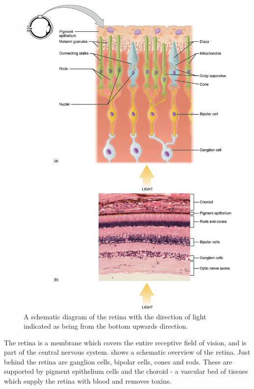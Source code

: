\begin{figure}[H]
\centering
  \includegraphics{figures/rods_and_cones}
\caption{A schematic diagram of the retina with the direction of light indicated
as being from the bottom upwards direction.\cite{yannuzzi2011retinal}}
\label{fig:retina}
\end{figure}

The retina is a membrane which covers the entire receptive field of
vision, and is part of the central nervous system.\cite{rogers1983neurite}
 shows a schematic overview of the retina. Just behind the
retina are ganglion cells, bipolar cells, cones and rods. These are supported
by pigment epithelium cells and the choroid - a vascular bed of tissues which
supply the retina with blood and removes toxins. \cite{lutty1996localization} 

